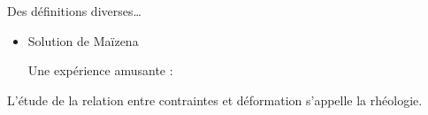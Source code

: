\begin{frame}{Des définitions diverses\ldots}
\begin{itemize}[<+-| alert@+>]
\item Solution de Maïzena 

Une expérience amusante : 
\href{https://www.youtube.com/watch?v=f2XQ97XHjVw}{
\color{blue}{https://www.youtube.com/watch?v=f2XQ97XHjVw}
}


\end{itemize}



\medskip
\pause


L'étude de la relation entre contraintes et déformation s'appelle la rhéologie.

\end{frame}



